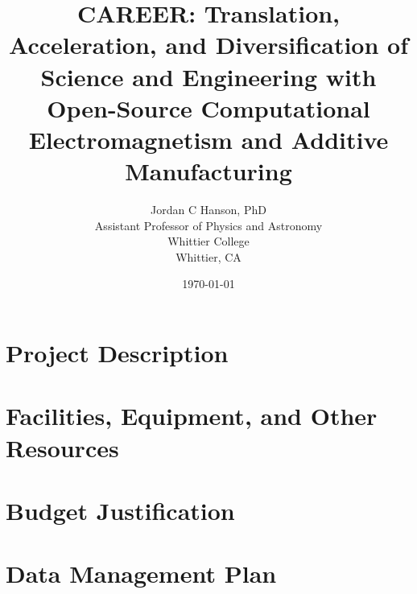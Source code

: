 \documentclass[10pt,twoside,openany]{book}
\title{CAREER: Translation, Acceleration, and Diversification of Science and Engineering with Open-Source Computational Electromagnetism and Additive Manufacturing}
\author{Jordan C Hanson, PhD \\ Assistant Professor of Physics and Astronomy \\ Whittier College \\ Whittier, CA}
\date{\today}
\begin{document}
\begin{flushleft}

\end{flushleft}

\begin{flushleft}

\end{flushleft}

\maketitle
\tableofcontents
\thispagestyle{empty}

\chapter{Project Description}
\thispagestyle{empty}
\begin{flushleft}

\end{flushleft}

\chapter{Facilities, Equipment, and Other Resources}
\thispagestyle{empty}
\begin{flushleft}

\end{flushleft}

\chapter{Budget Justification}
\thispagestyle{empty}
\begin{flushleft}

\end{flushleft}

\chapter{Data Management Plan}
\thispagestyle{empty}
\begin{flushleft}

\end{flushleft}

\small


 
\end{document}
